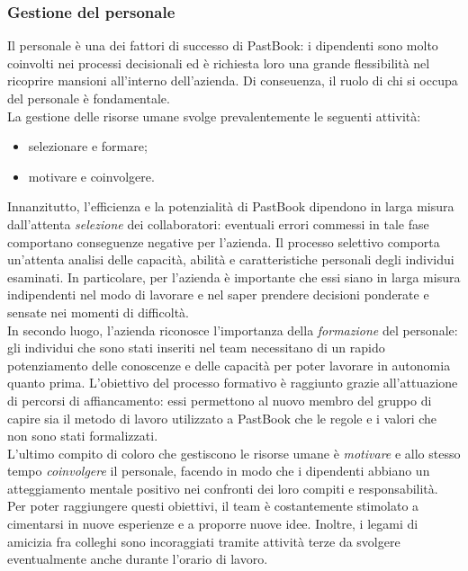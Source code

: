 			\subsubsection{Gestione del personale}
				Il personale è una dei fattori di successo di PastBook: i dipendenti sono molto coinvolti nei processi decisionali
				ed è richiesta loro una grande flessibilità nel ricoprire mansioni all'interno dell'azienda. Di conseuenza, il ruolo
				di chi si occupa del personale è fondamentale.\\
				La gestione delle risorse umane svolge prevalentemente le seguenti attività:
				\begin{itemize}
					\item selezionare e formare;
					\item motivare e coinvolgere.
				\end{itemize}
				Innanzitutto, l'efficienza e la potenzialità di PastBook dipendono in larga misura dall'attenta \emph{selezione} dei
				collaboratori: eventuali errori commessi in tale fase comportano conseguenze negative per l'azienda. Il processo
				selettivo comporta un'attenta analisi delle capacità, abilità e caratteristiche personali degli individui esaminati.
				In particolare, per l'azienda è importante che essi siano in larga misura indipendenti nel modo di lavorare e nel
				saper prendere decisioni ponderate e sensate nei momenti di difficoltà.\\
				In secondo luogo, l'azienda riconosce l'importanza della \emph{formazione} del personale: gli individui che sono
				stati inseriti nel team necessitano di un rapido potenziamento delle conoscenze e delle capacità per poter lavorare
				in autonomia quanto prima. L'obiettivo del processo formativo è raggiunto grazie all'attuazione di percorsi di
				affiancamento: essi permettono al nuovo membro del gruppo di capire sia il metodo di lavoro utilizzato a PastBook che
				le regole e i valori che non sono stati formalizzati.\\
				L'ultimo compito di coloro che gestiscono le risorse umane è \emph{motivare} e allo stesso tempo
				\emph{coinvolgere} il personale, facendo in modo che i dipendenti abbiano un atteggiamento mentale positivo nei
				confronti dei loro compiti e responsabilità. Per poter raggiungere questi obiettivi, il team è costantemente
				stimolato a cimentarsi in nuove esperienze e a proporre nuove idee. Inoltre, i legami di amicizia fra colleghi sono
				incoraggiati tramite attività terze da svolgere eventualmente anche durante l'orario di lavoro.
